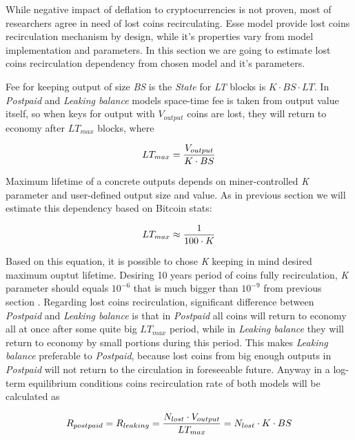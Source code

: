 \documentclass[]{article}   %
\newcommand{\authnote}[2]{\marginpar{\parbox{\marginparwidth}{\tiny %
  \textsf{#1 {\textcolor{blue}{notes: #2}}}}}%
  \textcolor{blue}{\textbf{\dag}}}
\newcommand{\authnote}[2]{
  \textsf{#1 \textcolor{blue}{: #2}}}
\newcommand{\authnote}[2]{}
\newcommand{\dnote}[1]{{\authnote{\textcolor{blue}{Dima notes}}{#1}}}
\newcommand{\esse}{Esse}
\newcommand{\state}{\textit{State}}
\begin{document}
While negative impact of deflation to cryptocurrencies is not proven, most of researchers agree in need of lost coins recirculating. \esse{} model provide lost coins recirculation mechanism by design, while it's properties vary from model implementation and parameters. In this section we are going to estimate lost coins recirculation dependency from chosen model and it's parameters.

Fee for keeping output of size \textit{BS} is the \state{} for \textit{LT} blocks is ${K \cdot BS \cdot LT}$. In \textit{Postpaid} and \textit{Leaking balance} models space-time fee is taken from output value itself, so when keys for output with \textit{$V_{output}$} coins are lost, they will return to economy after \textit{$LT_{max}$} blocks, where

\begin{equation}
{LT_{max} = {V_{output} \over K \cdot BS}}
\end{equation}

Maximum lifetime of a concrete outputs depends on miner-controlled \textit{K} parameter and user-defined output size and value. As in previous section we will estimate this dependency based on Bitcoin stats:

\begin{equation}
{LT_{max} \approx {1 \over 100 \cdot K}}
\end{equation}

Based on this equation, it is possible to chose \textit{K} keeping in mind desired maximum ouptut lifetime. Desiring 10 years period of coins fully recirculation, \textit{K} parameter should equals $10^{-6}$ that is much bigger than $10^{-9}$ from previous section \dnote{$??? 10 is too small, you'll be able to spend only hlaf of your money after 5 years$}. Regarding lost coins recirculation, significant difference between \textit{Postpaid} and \textit{Leaking balance} is that in \textit{Postpaid} all coins will return to economy all at once after some quite big $LT_{max}$ period, while in \textit{Leaking balance} they will return to economy by small portions during this period. This makes \textit{Leaking balance} preferable to \textit{Postpaid}, because lost coins from big enough outputs in \textit{Postpaid} will not return to the circulation in foreseeable future. Anyway in a log-term equilibrium conditions coins recirculation rate of both models will be calculated as

\begin{equation}
R_{postpaid} = R_{leaking} = {N_{lost} \cdot V_{output} \over LT_{max}} = {N_{lost} \cdot K \cdot BS}
\end{equation}
\end{document}
